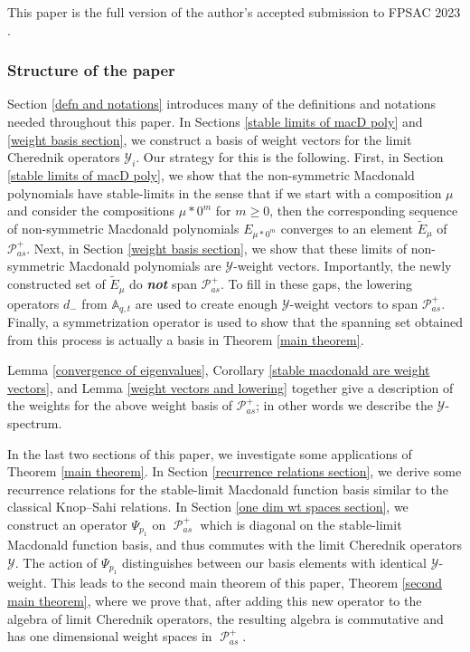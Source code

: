 \documentclass[ALCO,Unicode]{cedram}
\newcommand{\y}{{ \mathscr{Y} }}
\DeclareMathOperator{\sP}{\mathscr{P} }
\begin{document}
\begin{rema}
This paper is the full version of the author's accepted submission to FPSAC 2023 \cite{MBW}.
\end{rema}

\subsubsection*{Structure of the paper}
Section \ref{defn and notations} introduces many of the definitions and notations needed throughout this paper. In Sections \ref{stable limits of macD poly} and \ref{weight basis section},
we construct a basis of weight vectors for the limit Cherednik operators $\mathscr{Y}_i$.
Our strategy for this is the following. First, in Section \ref{stable limits of macD poly}, we show that the non-symmetric Macdonald polynomials have stable-limits in the sense that if we start with a composition $\mu$ and consider the compositions $\mu * 0^m$ for $m \geq 0$, then the corresponding sequence of non-symmetric Macdonald polynomials $E_{\mu * 0^m}$ converges to an element $\widetilde{E}_{\mu}$ of $\mathscr{P}_{as}^{+}$. Next, in Section \ref{weight basis section}, we show that these limits of non-symmetric Macdonald polynomials are $\mathscr{Y}$-weight vectors. Importantly, the newly constructed set of $\widetilde{E}_{\mu}$ do \textbf{\textit{not}} span $\mathscr{P}_{as}^{+}$. To fill in these gaps, the lowering operators $d_{-}$ from $\mathbb{A}_{q,t}$ are used to create enough $\y$-weight vectors to span $\mathscr{P}_{as}^{+}$. Finally, a symmetrization operator is used to show that the spanning set obtained from this process is actually a basis in Theorem \ref{main theorem}.

Lemma \ref{convergence of eigenvalues}, Corollary \ref{stable macdonald are weight vectors}, and Lemma \ref{weight vectors and lowering} together give a description of the weights for the above weight basis of  $\mathscr{P}_{as}^{+}$; in other words we describe the $\y$-spectrum. 

In the last two sections of this paper, we investigate some applications of Theorem \ref{main theorem}. In 
Section \ref{recurrence relations section}, we derive some recurrence relations for the stable-limit Macdonald function basis similar to the classical Knop--Sahi relations. In Section \ref{one dim wt spaces section}, we construct an operator $\Psi_{p_1}$ on $\sP_{as}^{+}$ which is diagonal on the stable-limit Macdonald function basis, and thus commutes with the limit Cherednik operators $\y$. The action of $\Psi_{p_1}$  distinguishes between our basis elements with identical $\y$-weight. This leads to the second main theorem of this paper, Theorem \ref{second main theorem}, where we prove that, after adding this new operator to the algebra of limit Cherednik operators, the resulting algebra is commutative and has one dimensional weight spaces in $\sP_{as}^{+}.$
\end{document}
